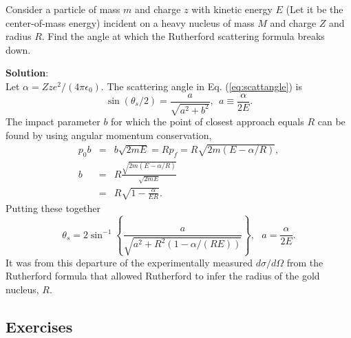 \example
Consider a particle of mass $m$ and charge $z$ with kinetic energy $E$ (Let it be the center-of-mass energy) incident on a heavy nucleus of mass $M$ and charge $Z$ and radius $R$. Find the angle at which the Rutherford scattering formula breaks down.

{\bf Solution}:\\
Let $\alpha=Zze^2/(4\pi\epsilon_0)$. The scattering angle in Eq. (\ref{eq:scattangle}) is 
\[
\sin(\theta_s/2)=\frac{a}{\sqrt{a^2+b^2}}, ~~a\equiv \frac{\alpha}{2E}.
\]
The impact parameter $b$ for which the point of closest approach equals $R$ can be found by using angular momentum conservation,
\begin{eqnarray*}
p_0b&=&b\sqrt{2mE}=Rp_f=R\sqrt{2m(E-\alpha/R)},\\
b&=&R\frac{\sqrt{2m(E-\alpha/R)}}{\sqrt{2mE}}\\
&=&R\sqrt{1-\frac{\alpha}{ER}}.
\end{eqnarray*}
Putting these together
\[
\theta_s=2\sin^{-1}\left\{
\frac{a}{\sqrt{a^2+R^2(1-\alpha/(RE))}}
\right\},~~~a=\frac{\alpha}{2E}.
\]
It was from this departure of the experimentally measured $d\sigma/d\Omega$ from the Rutherford formula that allowed Rutherford to infer the radius of the gold nucleus, $R$.

\exampleend

\subsection{Exercises}

